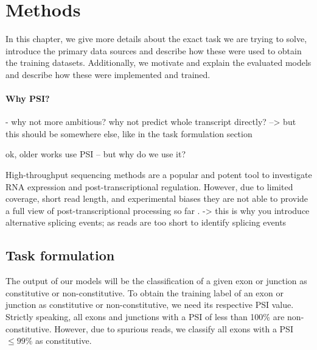 \chapter{\label{ch:4-methods}Methods}




In this chapter, we give more details about the exact task we are trying to solve, introduce the primary data sources and describe how these were used to obtain the training datasets. Additionally, we motivate and explain the evaluated models and describe how these were implemented and trained.

\subsubsection{Why PSI?} \label{subsubsec:whypsi}

- why not more ambitious? why not predict whole transcript directly? --> but this should be somewhere else, like in the task formulation section

ok, older works use PSI -- but why do we use it?

High-throughput sequencing methods are a popular and potent tool to investigate RNA expression and post-transcriptional regulation. However, due to limited coverage, short read length, and experimental biases they are not able to provide a full view of post-transcriptional processing so far \cite{berlinpsi}.
-> this is why you introduce alternative splicing events; as reads are too short to identify splicing events


\section{Task formulation} \label{sec:task_formulation}
The output of our models will be the classification of a given exon or junction as constitutive or non-constitutive. To obtain the training label of an exon or junction as constitutive or non-constitutive, we need its respective PSI value. 
Strictly speaking, all exons and junctions with a PSI of less than 100\% are non-constitutive. However, due to spurious reads, we classify all exons with a PSI $\leq 99\%$ as constitutive. 

